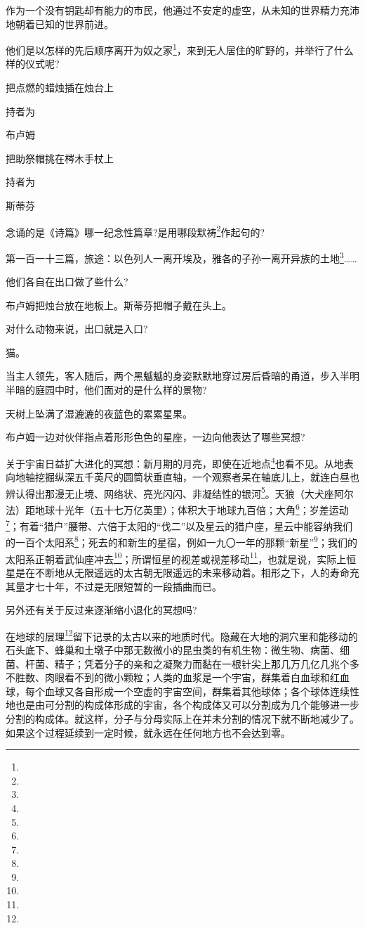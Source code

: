\par 作为一个没有钥匙却有能力的市民，他通过不安定的虚空，从未知的世界精力充沛地朝着已知的世界前进。
\par 他们是以怎样的先后顺序离开为奴之家\footnote{}，来到无人居住的旷野的，并举行了什么样的仪式呢?
\par 把点燃的蜡烛插在烛台上
\par 持者为
\par 布卢姆
\par 把助祭帽挑在梣木手杖上
\par 持者为
\par 斯蒂芬
\par 念诵的是《诗篇》哪一纪念性篇章?是用哪段默祷\footnote{}作起句的?
\par 第一百一十三篇，旅途：以色列人一离开埃及，雅各的子孙一离开异族的土地\footnote{}……
\par 他们各自在出口做了些什么?
\par 布卢姆把烛台放在地板上。斯蒂芬把帽子戴在头上。
\par 对什么动物来说，出口就是入口?
\par 猫。
\par 当主人领先，客人随后，两个黑魆魆的身姿默默地穿过房后昏暗的甬道，步入半明半暗的庭园中时，他们面对的是什么样的景物?
\par 天树上坠满了湿漉漉的夜蓝色的累累星果。
\par 布卢姆一边对伙伴指点着形形色色的星座，一边向他表达了哪些冥想?
\par 关于宇宙日益扩大进化的冥想：新月期的月亮，即使在近地点\footnote{}也看不见。从地表向地轴挖掘纵深五千英尺的圆筒状垂直轴，一个观察者呆在轴底儿上，就连白昼也辨认得出那漫无止境、网络状、亮光闪闪、非凝结性的银河\footnote{}。天狼（大犬座阿尔法）距地球十光年（五十七万亿英里）；体积大于地球九百倍；大角\footnote{}；岁差运动\footnote{}；有着“猎户”腰带、六倍于太阳的“伐二”以及星云的猎户座，星云中能容纳我们的一百个太阳系\footnote{}；死去的和新生的星宿，例如一九〇一年的那颗“新星”\footnote{}；我们的太阳系正朝着武仙座冲去\footnote{}；所谓恒星的视差或视差移动\footnote{}，也就是说，实际上恒星是在不断地从无限遥远的太古朝无限遥远的未来移动着。相形之下，人的寿命充其量才七十年，不过是无限短暂的一段插曲而已。
\par 另外还有关于反过来逐渐缩小退化的冥想吗?
\par 在地球的层理\footnote{}留下记录的太古以来的地质时代。隐藏在大地的洞穴里和能移动的石头底下、蜂巢和土墩子中那无数微小的昆虫类的有机生物：微生物、病菌、细菌、杆菌、精子；凭着分子的亲和之凝聚力而黏在一根针尖上那几万几亿几兆个多不胜数、肉眼看不到的微小颗粒；人类的血浆是一个宇宙，群集着白血球和红血球，每个血球又各自形成一个空虚的宇宙空间，群集着其他球体；各个球体连续性地也是由可分割的构成体形成的宇宙，各个构成体又可以分割成为几个能够进一步分割的构成体。就这样，分子与分母实际上在并未分割的情况下就不断地减少了。如果这个过程延续到一定时候，就永远在任何地方也不会达到零。
